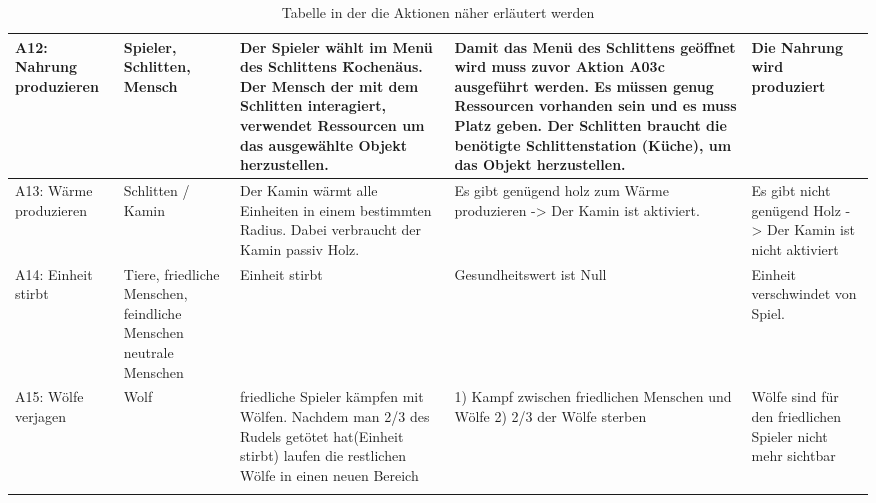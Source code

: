 \documentclass[a4paper,
  twoside, %
  headlines=2.1 %
  ]{scrartcl}
\begin{document}
\begin{center}
\begin{longtable}{ | p{1.5cm} | p{1.5cm} | p{3.5cm} | p{3.5cm} | p{3.5cm} | }
                A12: Nahrung produzieren & Spieler, Schlitten, Mensch & Der Spieler wählt im Menü des Schlittens \"Kochen\" aus. Der Mensch der mit dem Schlitten interagiert, verwendet Ressourcen um das ausgewählte Objekt herzustellen. & Damit das Menü des Schlittens geöffnet wird muss zuvor Aktion A03c ausgeführt werden. Es müssen genug Ressourcen vorhanden sein und es muss Platz geben. Der Schlitten braucht die benötigte Schlittenstation (Küche), um das Objekt herzustellen.& Die Nahrung wird produziert\\
                \hline
                A13: Wärme produzieren & Schlitten / Kamin & Der Kamin wärmt alle Einheiten in einem bestimmten Radius. Dabei verbraucht der Kamin passiv Holz. & Es gibt genügend holz zum Wärme produzieren -> Der Kamin ist aktiviert. & Es gibt nicht genügend Holz -> Der Kamin ist nicht aktiviert\\
                 \hline
                A14: Einheit stirbt & Tiere, friedliche Menschen, feindliche Menschen neutrale Menschen & Einheit stirbt & Gesundheitswert ist Null & Einheit verschwindet von Spiel. \\
                \hline
                \hline
                A15: Wölfe verjagen & Wolf & friedliche Spieler kämpfen mit Wölfen. Nachdem man 2/3 des Rudels getötet hat(Einheit stirbt) laufen die restlichen Wölfe in einen neuen Bereich & 1) Kampf zwischen friedlichen Menschen und Wölfe 2) 2/3 der Wölfe sterben & Wölfe sind für den friedlichen Spieler nicht mehr sichtbar \\
                \hline
                \caption{Tabelle in der die Aktionen näher erläutert werden}
			    \label{tab:tabelle2}


			  \end{longtable}
		\end{center}
\end{document}
